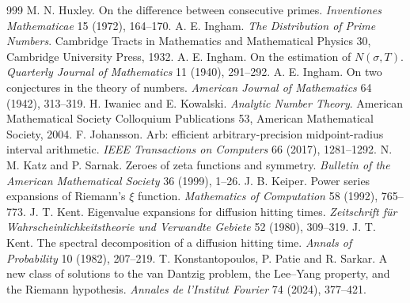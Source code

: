 \begin{thebibliography}{999}
 M. N. Huxley. On the difference between consecutive primes. \emph{Inventiones Mathematicae} 15 (1972), 164--170.
 A. E. Ingham. \emph{The Distribution of Prime Numbers}. Cambridge Tracts in Mathematics and Mathematical Physics 30, Cambridge University Press, 1932.
 A. E. Ingham. On the estimation of $N(\sigma,T)$. \emph{Quarterly Journal of Mathematics} 11 (1940), 291--292.
 A. E. Ingham. On two conjectures in the theory of numbers. \emph{American Journal of Mathematics} 64 (1942), 313--319.
 H. Iwaniec and E. Kowalski. \emph{Analytic Number Theory}. American Mathematical Society Colloquium Publications 53, American Mathematical Society, 2004.
 F. Johansson. Arb: efficient arbitrary-precision midpoint-radius interval arithmetic. \emph{IEEE Transactions on Computers} 66 (2017), 1281--1292.
 N. M. Katz and P. Sarnak. Zeroes of zeta functions and symmetry. \emph{Bulletin of the American Mathematical Society} 36 (1999), 1--26.
 J. B. Keiper. Power series expansions of Riemann's $\xi$ function. \emph{Mathematics of Computation} 58 (1992), 765--773.
 J. T. Kent. Eigenvalue expansions for diffusion hitting times. \emph{Zeitschrift f\"ur Wahrscheinlichkeitstheorie und Verwandte Gebiete} 52 (1980), 309--319.
 J. T. Kent. The spectral decomposition of a diffusion hitting time. \emph{Annals of Probability} 10 (1982), 207--219.
 T. Konstantopoulos, P. Patie and R. Sarkar. A new class of solutions to the van Dantzig problem, the Lee--Yang property, and the Riemann hypothesis. \emph{Annales de l'Institut Fourier} 74 (2024), 377--421.

\end{thebibliography}
